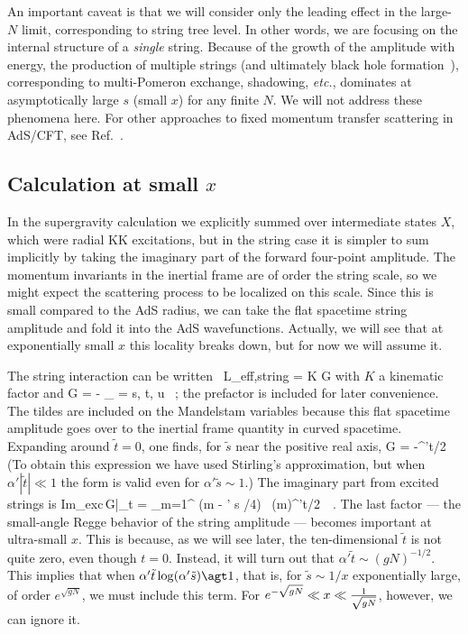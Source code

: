 An important caveat is that we will consider only the leading effect
in the large-$N$ limit, corresponding to string tree level.  In other
words, we are focusing on the internal structure of a {\it single}
string.  Because of the growth of the amplitude with energy, the
production of multiple strings (and ultimately black hole
formation~\cite{giddings}), corresponding to multi-Pomeron exchange,
shadowing, {\it etc.}, dominates at asymptotically large $s$ (small
$x$) for any finite $N$.  We will not address these phenomena here.
For other approaches to fixed momentum
transfer scattering in AdS/CFT, see Ref.~\cite{eikon}.


\subsection{Calculation at small $x$}


In the supergravity calculation we explicitly summed over intermediate states
$X$, which were radial KK excitations, but in the string case it is simpler to sum
implicitly by taking the imaginary part of the forward four-point amplitude.
The momentum invariants in the inertial frame are of order the string
scale, so we might expect the scattering process to be localized on this
scale.  Since this is small compared to the AdS radius, we can take the
flat spacetime string amplitude and fold it into the AdS wavefunctions.
Actually, we will see that at exponentially small $x$ this locality breaks
down, but for now we will assume it.


The string interaction can be written~\cite{GSW}
{\cal L}_{\rm eff,string} = K G
\ee
with $K$ a kinematic factor and  
G = - \prod_{ \xi =  s, t, u}
\ ;
\ee
%
the prefactor is included for later convenience.  The tildes are
included on the Mandelstam variables because this flat spacetime
amplitude goes over to the inertial frame quantity in curved
spacetime.  Expanding around $\tilde t=0$, one finds, for $\tilde s$
near the positive real axis,
%
G =  -
^{\alpha'\tilde t/2}
\ee
%
(To obtain this expression we have used Stirling's approximation, but
when $\alpha'|\tilde t|\ll1$ the form is valid even for $\alpha'\tilde
s\sim 1$.)  The imaginary part from excited strings is
%
{\rm Im}_{\rm exc}\,G|_{\tilde t } = 
\sum_{m=1}^\infty
\delta(m - \alpha' \tilde s /4) \ ({m})^{\alpha'\tilde t/2}\
\ .
\ee
The last factor --- the small-angle Regge behavior of the string
amplitude --- becomes important at ultra-small $x$.  This is because,
as we will see later, the ten-dimensional $\tilde t$ is not quite
zero, even though $t=0$.  Instead, it will turn out that $\alpha'\tilde t\sim
(gN)^{-1/2}.$  This implies that when $\alpha'\tilde
t\log(\alpha'\tilde s) \agt 1$, that is, for $\tilde s \sim 1/x$
exponentially large, of order $e^{\sqrt{gN}}$, we must include this
term.  For $e^{-\sqrt{gN}}\ll x \ll {1\over\sqrt{gN}}$,
however, we can ignore it.

